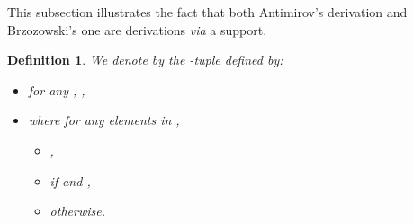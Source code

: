 \documentclass{article}
\newtheorem{definition}{Definition}
\begin{document}
     This subsection illustrates the fact that both Antimirov's derivation and  Brzozowski's one are derivations \emph{via} a support.
     
     \begin{definition}\label{def support anti}
       We denote by  the -tuple defined by:
   \begin{itemize}
     \item for any , ,
     \item  where for any elements   in ,
     \begin{itemize}
        \item ,
        \item  if  and ,
        \item  otherwise.
      \end{itemize}
    \end{itemize}
     \end{definition}
   
\end{document}
